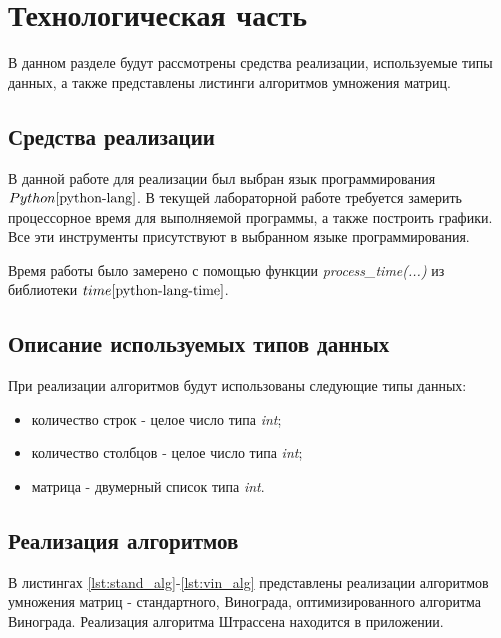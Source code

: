 \chapter{Технологическая часть}

В данном разделе будут рассмотрены средства реализации, используемые типы данных, а также представлены листинги алгоритмов умножения матриц.

\section{Средства реализации}
В данной работе для реализации был выбран язык программирования $Python \cite{python-lang}$. В текущей лабораторной работе требуется замерить процессорное время для выполняемой программы, а также построить графики. Все эти инструменты присутствуют в выбранном языке программирования.

Время работы было замерено с помощью функции \textit{process\_time(...)} из библиотеки $time \cite{python-lang-time}$.

\section{Описание используемых типов данных}

При реализации алгоритмов будут использованы следующие типы данных:

\begin{itemize}
	\item количество строк - целое число типа \textit{int};
	\item количество столбцов - целое число типа \textit{int};
	\item матрица - двумерный список типа \textit{int}.
\end{itemize}



\section{Реализация алгоритмов}

В листингах \ref{lst:stand_alg}-\ref{lst:vin_alg} представлены реализации алгоритмов умножения матриц - стандартного, Винограда, оптимизированного алгоритма Винограда. Реализация алгоритма Штрассена находится в приложении.

